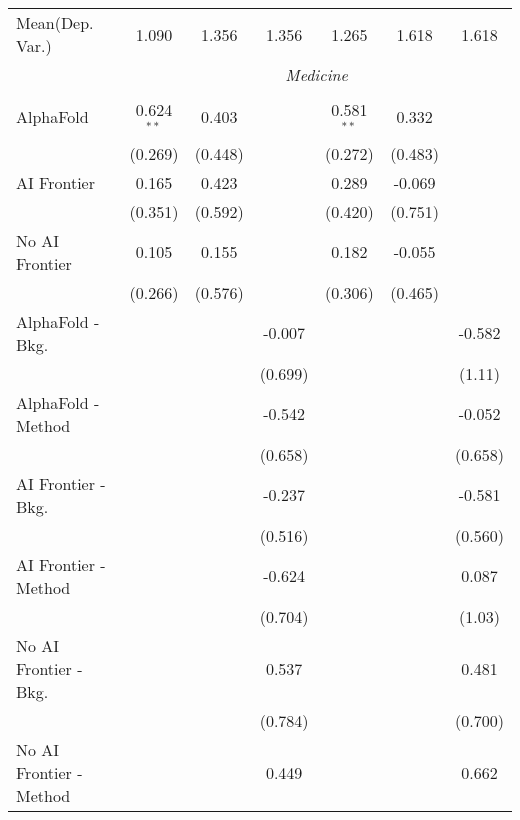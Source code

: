 \begin{tabular}{lcccccc}
Mean(Dep. Var.) & 1.090 & 1.356 & 1.356 & 1.265 & 1.618 & 1.618 \\
 & \multicolumn{6}{c}{\textit{Medicine}} \\ \\
   AlphaFold               & 0.624$^{**}$ & 0.403   &         & 0.581$^{**}$ & 0.332   &   \\   
                           & (0.269)      & (0.448) &         & (0.272)      & (0.483) &   \\   
   AI Frontier             & 0.165        & 0.423   &         & 0.289        & -0.069  &   \\   
                           & (0.351)      & (0.592) &         & (0.420)      & (0.751) &   \\   
   No AI Frontier          & 0.105        & 0.155   &         & 0.182        & -0.055  &   \\   
                           & (0.266)      & (0.576) &         & (0.306)      & (0.465) &   \\   
   AlphaFold - Bkg.        &              &         & -0.007  &              &         & -0.582\\   
                           &              &         & (0.699) &              &         & (1.11)\\   
   AlphaFold - Method      &              &         & -0.542  &              &         & -0.052\\   
                           &              &         & (0.658) &              &         & (0.658)\\   
   AI Frontier - Bkg.      &              &         & -0.237  &              &         & -0.581\\   
                           &              &         & (0.516) &              &         & (0.560)\\   
   AI Frontier - Method    &              &         & -0.624  &              &         & 0.087\\   
                           &              &         & (0.704) &              &         & (1.03)\\   
   No AI Frontier - Bkg.   &              &         & 0.537   &              &         & 0.481\\   
                           &              &         & (0.784) &              &         & (0.700)\\   
   No AI Frontier - Method &              &         & 0.449   &              &         & 0.662\\   

\end{tabular}
